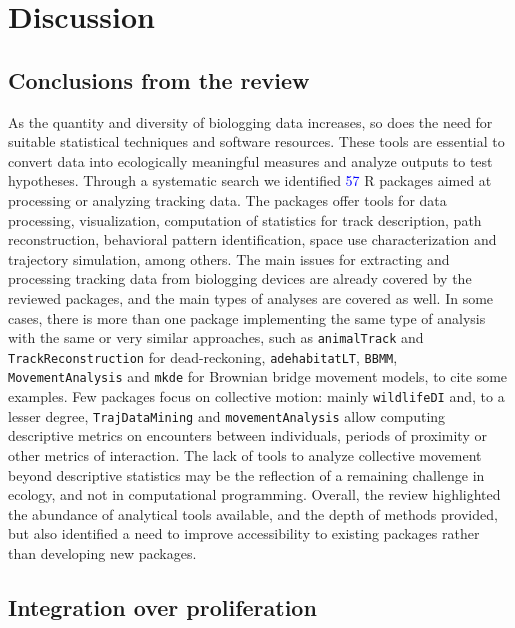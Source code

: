 \documentclass[a4paper,12pt]{article}
\newcommand{\Rpkg}[1]{\texttt{#1}}
\begin{document}
\section*{Discussion}
%
%
\subsection*{Conclusions from the review}

As the quantity and diversity of biologging data increases, so does the need for suitable statistical techniques and software resources. These tools are essential to convert data into ecologically meaningful measures and analyze outputs to test hypotheses. Through a systematic search we identified \textcolor{blue}{57} R packages aimed at processing or analyzing tracking data. The packages offer tools for data processing, visualization, computation of statistics for track description, path reconstruction, behavioral pattern identification, space use characterization and trajectory simulation, among others. 
The main issues for extracting and processing tracking data from biologging devices are already covered by the reviewed packages, and the main types of analyses are covered as well. %
In some cases, there is more than one package implementing the same type of analysis with the same or very similar approaches, such as \Rpkg{animalTrack} and \Rpkg{TrackReconstruction} for dead-reckoning, \Rpkg{adehabitatLT}, \Rpkg{BBMM}, \Rpkg{MovementAnalysis} and \Rpkg{mkde} for Brownian bridge movement models, to cite some examples. Few packages focus on collective motion: mainly \Rpkg{wildlifeDI} and, to a lesser degree, \Rpkg{TrajDataMining} and \Rpkg{movementAnalysis} allow computing descriptive metrics on encounters between individuals, periods of proximity or other metrics of interaction. The lack of tools to analyze collective movement beyond descriptive statistics may be the reflection of a remaining challenge in ecology, and not in computational programming. 
Overall, the review highlighted the abundance of analytical tools available, and the depth of methods provided, but also identified a need to improve accessibility to existing packages rather than developing new packages. %

\subsection*{Integration over proliferation}
\end{document}
